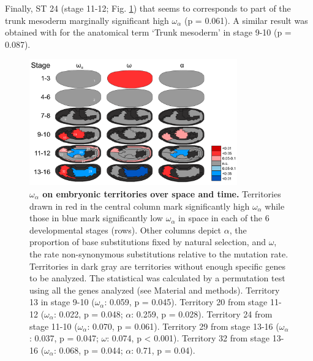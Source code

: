 Finally, ST 24 (stage 11-12; Fig. \ref{fig:Art-III-OmegaA_territories}) that seems to corresponds to part of the trunk mesoderm marginally significant high $\omega_{\alpha}$ (p = 0.061). A similar result was obtained with for the anatomical term `Trunk mesoderm' in stage 9-10 (p = 0.087).

\begin{figure}[t]
  \includegraphics[width=0.8\textwidth]{./Images/Art-III/OmegaA_territories.png}
  \centering
  \caption{\textbf{{\large$\omega_{\alpha}$} on embryonic territories over space and time.}
   Territories drawn in red in the central column mark significantly high $\omega_{\alpha}$ while those in blue mark significantly low $\omega_{\alpha}$ in space in each of the 6 developmental stages (rows). Other columns depict $\alpha$, the proportion of base substitutions fixed by natural selection, and $\omega$, the rate non-synonymous substitutions relative to the mutation rate. 
  Territories in dark gray are territories without enough specific genes to be analyzed. The statistical was calculated by a permutation test using all the genes analyzed (see Material and methods). Territory 13 in stage 9-10 ($\omega_{\alpha}$: 0.059, p = 0.045). Territory 20 from stage 11-12 ($\omega_{\alpha}$: 0.022, p = 0.048; $\alpha$: 0.259, p = 0.028). Territory 24 from stage 11-10 ($\omega_{\alpha}$: 0.070, p = 0.061). Territory 29 from stage 13-16 ($\omega_{\alpha}$: 0.037, p = 0.047; $\omega$: 0.074, p < 0.001). Territory 32 from stage 13-16 ($\omega_{\alpha}$: 0.068, p = 0.044; $\alpha$: 0.71, p = 0.04).
  }
  \label{fig:Art-III-OmegaA_territories}
\end{figure}

